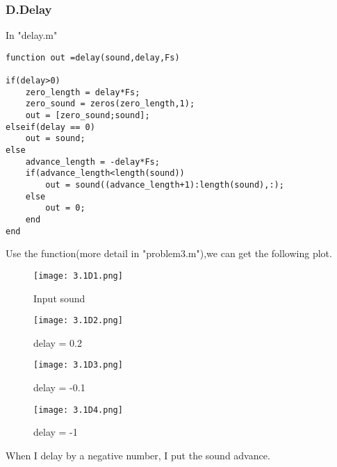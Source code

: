 \documentclass{article}
\begin{document}
\subsubsection*{D.Delay}
In "delay.m"
\begin{lstlisting}
function out =delay(sound,delay,Fs)

if(delay>0)
    zero_length = delay*Fs;
    zero_sound = zeros(zero_length,1);
    out = [zero_sound;sound];
elseif(delay == 0)
    out = sound;
else
    advance_length = -delay*Fs;
    if(advance_length<length(sound))
        out = sound((advance_length+1):length(sound),:);
    else
        out = 0;
    end
end
\end{lstlisting}
Use the function(more detail in "problem3.m"),we can get the following plot.\par
\begin{figure}[h]
    \begin{minipage}{0.45\textwidth}
        \centering
        \texttt{[image: 3.1D1.png]}
        \caption{Input sound}
    \end{minipage}
    \begin{minipage}{0.45\textwidth}
        \centering
        \texttt{[image: 3.1D2.png]}
        \caption{delay = 0.2}
    \end{minipage}
    \quad

    \begin{minipage}{0.45\textwidth}
        \centering
        \texttt{[image: 3.1D3.png]}
        \caption{delay = -0.1}
    \end{minipage}
    \begin{minipage}{0.45\textwidth}
        \centering
        \texttt{[image: 3.1D4.png]}
        \caption{delay = -1}
    \end{minipage}
\end{figure}
When I delay by a negative number, I put the sound advance.
\end{document}
